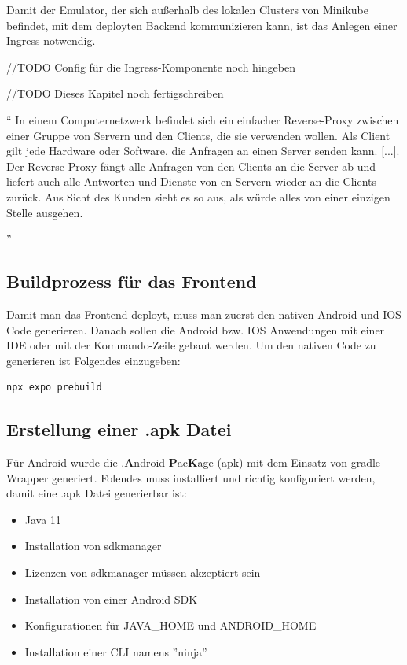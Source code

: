 Damit der Emulator, der sich außerhalb des lokalen Clusters von Minikube befindet,
mit dem deployten Backend kommunizieren kann,
ist das Anlegen einer Ingress notwendig.

//TODO Config für die Ingress-Komponente noch hingeben

//TODO Dieses Kapitel noch fertigschreiben



``
In einem Computernetzwerk befindet sich ein einfacher Reverse-Proxy zwischen einer
Gruppe von Servern und den Clients, die sie verwenden wollen.
Als Client gilt jede Hardware oder Software, die Anfragen an einen Server senden kann. [...].
Der Reverse-Proxy fängt alle Anfragen von den Clients an die Server ab und liefert auch
alle Antworten und Dienste von
en Servern wieder an die Clients zurück. Aus Sicht des Kunden sieht es so aus,
als würde alles von einer einzigen Stelle ausgehen.

''
\cite{reverse-proxy}

\subsection{Buildprozess für das Frontend}

Damit man das Frontend deployt, muss man zuerst den nativen Android und IOS Code generieren.
Danach sollen die Android bzw. IOS Anwendungen mit einer IDE oder mit der Kommando-Zeile gebaut werden.
Um den nativen Code zu generieren ist Folgendes einzugeben:
\begin{lstlisting}[language=Bash,caption=generate android and ios]
npx expo prebuild
\end{lstlisting}





\subsection{Erstellung einer .apk Datei}
Für Android wurde die .\textbf{A}ndroid \textbf{P}ac\textbf{K}age (apk)  mit dem Einsatz von gradle Wrapper generiert.
Folendes muss installiert und richtig konfiguriert werden, damit  eine .apk Datei generierbar ist:



\begin{itemize}
  \item Java 11
  \item Installation von sdkmanager
  \item Lizenzen von sdkmanager müssen akzeptiert sein
  \item Installation von einer Android SDK
  \item Konfigurationen für JAVA\_HOME und ANDROID\_HOME
  \item Installation einer CLI namens ''ninja''
\end{itemize}

